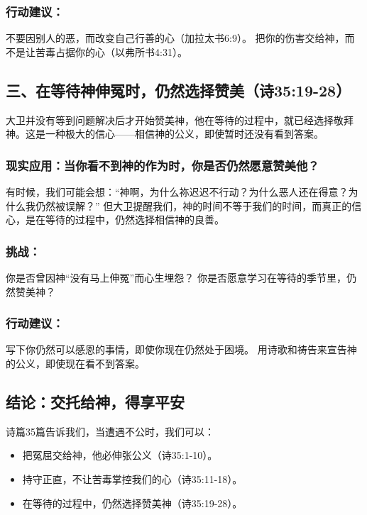 \documentclass[a4paper, 12pt]{article}
\begin{document}
\subsubsection*{行动建议：}

不要因别人的恶，而改变自己行善的心（加拉太书6:9）。
把你的伤害交给神，而不是让苦毒占据你的心（以弗所书4:31）。
\subsection*{三、在等待神伸冤时，仍然选择赞美（诗35:19-28）}

大卫并没有等到问题解决后才开始赞美神，他在等待的过程中，就已经选择敬拜神。这是一种极大的信心——相信神的公义，即使暂时还没有看到答案。

\subsubsection*{现实应用：当你看不到神的作为时，你是否仍然愿意赞美他？}
有时候，我们可能会想：“神啊，为什么祢迟迟不行动？为什么恶人还在得意？为什么我仍然被误解？” 但大卫提醒我们，神的时间不等于我们的时间，而真正的信心，是在等待的过程中，仍然选择相信神的良善。

\subsubsection*{挑战：}
你是否曾因神“没有马上伸冤”而心生埋怨？
你是否愿意学习在等待的季节里，仍然赞美神？
\subsubsection*{行动建议：}

写下你仍然可以感恩的事情，即使你现在仍然处于困境。
用诗歌和祷告来宣告神的公义，即使现在看不到答案。
\subsection*{结论：交托给神，得享平安}
诗篇35篇告诉我们，当遭遇不公时，我们可以：
\begin{itemize}
    \item 把冤屈交给神，他必伸张公义（诗35:1-10）。

    \item 持守正直，不让苦毒掌控我们的心（诗35:11-18）。

    \item 在等待的过程中，仍然选择赞美神（诗35:19-28）。

\end{itemize}
\end{document}
